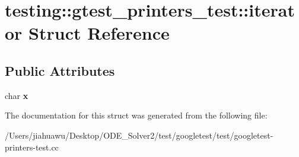 \hypertarget{structtesting_1_1gtest__printers__test_1_1iterator}{}\section{testing\+:\+:gtest\+\_\+printers\+\_\+test\+:\+:iterator Struct Reference}
\label{structtesting_1_1gtest__printers__test_1_1iterator}
\subsection*{Public Attributes}
\begin{DoxyCompactItemize}
\item 
\mbox{\label{structtesting_1_1gtest__printers__test_1_1iterator_a3d4d056077d3b3869259bdfd60a0778f}} 
char {\bfseries x}
\end{DoxyCompactItemize}


The documentation for this struct was generated from the following file\+:\begin{DoxyCompactItemize}
\item 
/\+Users/jiahuawu/\+Desktop/\+O\+D\+E\+\_\+\+Solver2/test/googletest/test/googletest-\/printers-\/test.\+cc\end{DoxyCompactItemize}

